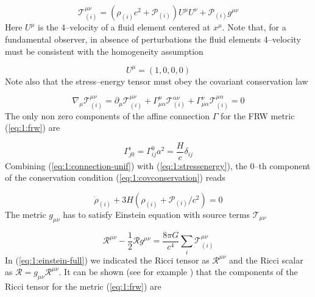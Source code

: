 \begin{equation}
\label{eq:1:stressenergy}
\mathcal{T}_{(i)}^{\mu\nu} = \left(\rho_{(i)}c^2+\mathcal{P}_{(i)}\right)U^\mu U^\nu + \mathcal{P}_{(i)}g^{\mu\nu}
\end{equation} 
%
Here $U^\mu$ is the 4--velocity of a fluid element centered at $x^\mu$. Note that, for a fundamental observer, in absence of perturbations the fluid elements 4--velocity must be consistent with the homogeneity assumption 

\begin{equation}
\label{eq:1:4-momentum-unif}
U^\mu = (1,0,0,0)
\end{equation}
%
Note also that the stress--energy tensor must obey the covariant conservation law

\begin{equation}
\label{eq:1:covconservation}
\nabla_\mu \mathcal{T}^{\mu\nu}_{(i)} = \partial_\mu \mathcal{T}^{\mu\nu}_{(i)} + \Gamma_{\mu\alpha}^\mu \mathcal{T}^{\alpha\nu}_{(i)} + \Gamma^\nu_{\mu\alpha}\mathcal{T}^{\mu\alpha}_{(i)} = 0 
\end{equation} 
%
The only non zero components of the affine connection $\Gamma$ for the FRW metric (\ref{eq:1:frw}) are

\begin{equation}
\label{eq:1:connection-unif}
\Gamma^i_{j0} = {\Gamma^0_{ij}}{a^2} = \frac{H}{c}\delta_{ij}
\end{equation}
%
Combining (\ref{eq:1:connection-unif}) with (\ref{eq:1:stressenergy}), the 0--th component of the conservation condition (\ref{eq:1:covconservation}) reads

\begin{equation}
\label{eq:1:rho-conservation}
\dot{\rho}_{(i)} + 3H\left(\rho_{(i)} + \mathcal{P}_{(i)}/c^2\right) = 0
\end{equation}
%
The metric $g_{\mu\nu}$ has to satisfy Einstein equation with source terms $\mathcal{T}_{\mu\nu}$

\begin{equation}
\label{eq:1:einstein-full}
\mathcal{R}^{\mu\nu}-\frac{1}{2}\mathcal{R}g^{\mu\nu} = \frac{8\pi G}{c^4}\sum_i \mathcal{T}^{\mu\nu}_{(i)}
\end{equation}
%
In (\ref{eq:1:einstein-full}) we indicated the Ricci tensor as $\mathcal{R}^{\mu\nu}$ and the Ricci scalar as $\mathcal{R}=g_{\mu\nu}\mathcal{R}^{\mu\nu}$. It can be shown (see for example \citep{Dodelson-C1}) that the components of the Ricci tensor for the metric (\ref{eq:1:frw}) are 

